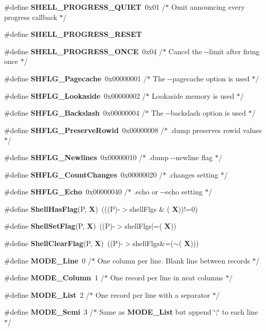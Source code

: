 \begin{DoxyCompactItemize}
\item 
\#define \textbf{ S\+H\+E\+L\+L\+\_\+\+P\+R\+O\+G\+R\+E\+S\+S\+\_\+\+Q\+U\+I\+ET}~0x01  /$\ast$ Omit announcing every progress callback $\ast$/
\item 
\#define \textbf{ S\+H\+E\+L\+L\+\_\+\+P\+R\+O\+G\+R\+E\+S\+S\+\_\+\+R\+E\+S\+ET}
\item 
\#define \textbf{ S\+H\+E\+L\+L\+\_\+\+P\+R\+O\+G\+R\+E\+S\+S\+\_\+\+O\+N\+CE}~0x04  /$\ast$ Cancel the -\/-\/limit after firing once $\ast$/
\item 
\#define \textbf{ S\+H\+F\+L\+G\+\_\+\+Pagecache}~0x00000001 /$\ast$ The -\/-\/pagecache option is used $\ast$/
\item 
\#define \textbf{ S\+H\+F\+L\+G\+\_\+\+Lookaside}~0x00000002 /$\ast$ Lookaside memory is used $\ast$/
\item 
\#define \textbf{ S\+H\+F\+L\+G\+\_\+\+Backslash}~0x00000004 /$\ast$ The -\/-\/backslash option is used $\ast$/
\item 
\#define \textbf{ S\+H\+F\+L\+G\+\_\+\+Preserve\+Rowid}~0x00000008 /$\ast$ .\+dump preserves rowid values $\ast$/
\item 
\#define \textbf{ S\+H\+F\+L\+G\+\_\+\+Newlines}~0x00000010 /$\ast$ .\+dump -\/-\/newline flag $\ast$/
\item 
\#define \textbf{ S\+H\+F\+L\+G\+\_\+\+Count\+Changes}~0x00000020 /$\ast$ .\+changes setting $\ast$/
\item 
\#define \textbf{ S\+H\+F\+L\+G\+\_\+\+Echo}~0x00000040 /$\ast$ .\+echo or -\/-\/echo setting $\ast$/
\item 
\#define \textbf{ Shell\+Has\+Flag}(P,  \textbf{ X})~(((P)-\/$>$shell\+Flgs \& (\textbf{ X}))!=0)
\item 
\#define \textbf{ Shell\+Set\+Flag}(P,  \textbf{ X})~((P)-\/$>$shell\+Flgs$\vert$=(\textbf{ X}))
\item 
\#define \textbf{ Shell\+Clear\+Flag}(P,  \textbf{ X})~((P)-\/$>$shell\+Flgs\&=($\sim$(\textbf{ X})))
\item 
\#define \textbf{ M\+O\+D\+E\+\_\+\+Line}~0  /$\ast$ One column per line.  Blank line between records $\ast$/
\item 
\#define \textbf{ M\+O\+D\+E\+\_\+\+Column}~1  /$\ast$ One record per line in neat columns $\ast$/
\item 
\#define \textbf{ M\+O\+D\+E\+\_\+\+List}~2  /$\ast$ One record per line with a separator $\ast$/
\item 
\#define \textbf{ M\+O\+D\+E\+\_\+\+Semi}~3  /$\ast$ Same as \textbf{ M\+O\+D\+E\+\_\+\+List} but append \char`\"{};\char`\"{} to each line $\ast$/

\end{DoxyCompactItemize}
